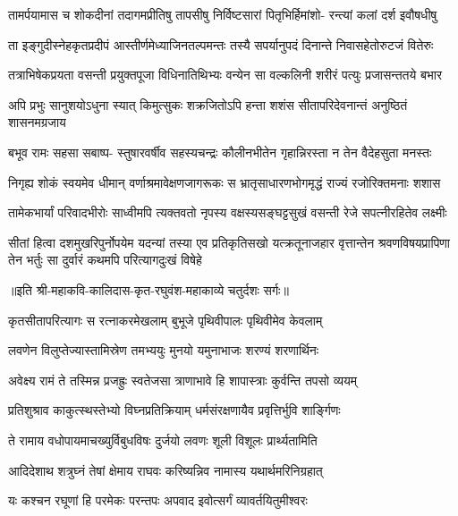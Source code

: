 \fourlineindentedshloka
{तामर्पयामास च शोकदीनां}
{तदागमप्रीतिषु तापसीषु}
{निर्विष्टसारां पितृभिर्हिमांशो-}
{रन्त्यां कलां दर्श इवौषधीषु} %

\fourlineindentedshloka
{ता इङ्गुदीस्नेहकृतप्रदीपं}
{आस्तीर्णमेध्याजिनतल्पमन्तः}
{तस्यै सपर्यानुपदं दिनान्ते}
{निवासहेतोरुटजं वितेरुः} %

\fourlineindentedshloka
{तत्राभिषेकप्रयता वसन्ती}
{प्रयुक्तपूजा विधिनातिथिभ्यः}
{वन्येन सा वल्कलिनी शरीरं}
{पत्युः प्रजासन्ततये बभार} %

\fourlineindentedshloka
{अपि प्रभुः सानुशयोऽधुना स्यात्}
{किमुत्सुकः शक्रजितोऽपि हन्ता}
{शशंस सीतापरिदेवनान्तं}
{अनुष्ठितं शासनमग्रजाय} %

\fourlineindentedshloka
{बभूव रामः सहसा सबाष्प-}
{स्तुषारवर्षीव सहस्यचन्द्रः}
{कौलीनभीतेन गृहान्निरस्ता}
{न तेन वैदेहसुता मनस्तः} %

\fourlineindentedshloka
{निगृह्य शोकं स्वयमेव धीमान्}
{वर्णाश्रमावेक्षणजागरूकः}
{स भ्रातृसाधारणभोगमृद्धं}
{राज्यं रजोरिक्तमनाः शशास} %

\fourlineindentedshloka
{तामेकभार्यां परिवादभीरोः}
{साध्वीमपि त्यक्तवतो नृपस्य}
{वक्षस्यसङ्घट्टसुखं वसन्ती}
{रेजे सपत्नीरहितेव लक्ष्मीः} %

\fourlineindentedshloka
{सीतां हित्वा दशमुखरिपुर्नोपयेम यदन्यां}
{तस्या एव प्रतिकृतिसखो यत्क्रतूनाजहार}
{वृत्तान्तेन श्रवणविषयप्रापिणा तेन भर्तुः}
{सा दुर्वारं कथमपि परित्यागदुःखं विषेहे} %

॥इति श्री-महाकवि-कालिदास-कृत-रघुवंश-महाकाव्ये चतुर्दशः सर्गः॥


\twolineshloka
{कृतसीतापरित्यागः स रत्नाकरमेखलाम्}
{बुभूजे पृथिवीपालः पृथिवीमेव केवलाम्} %

\twolineshloka
{लवणेन विलुप्तेज्यास्तामिस्रेण तमभ्ययुः}
{मुनयो यमुनाभाजः शरण्यं शरणार्थिनः} %

\twolineshloka
{अवेक्ष्य रामं ते तस्मिन्न प्रजह्रुः स्वतेजसा}
{त्राणाभावे हि शापास्त्राः कुर्वन्ति तपसो व्ययम्} %

\twolineshloka
{प्रतिशुश्राव काकुत्स्थस्तेभ्यो विघ्नप्रतिक्रियाम्}
{धर्मसंरक्षणायैव प्रवृत्तिर्भुवि शार्ङ्गिणः} %

\twolineshloka
{ते रामाय वधोपायमाचख्युर्विबुधविषः}
{दुर्जयो लवणः शूली विशूलः प्रार्थ्यतामिति} %

\twolineshloka
{आदिदेशाथ शत्रुघ्नं तेषां क्षेमाय राघवः}
{करिष्यन्निव नामास्य यथार्थमरिनिग्रहात्} %

\twolineshloka
{यः कश्चन रघूणां हि परमेकः परन्तपः}
{अपवाद इवोत्सर्गं व्यावर्तयितुमीश्वरः} %

